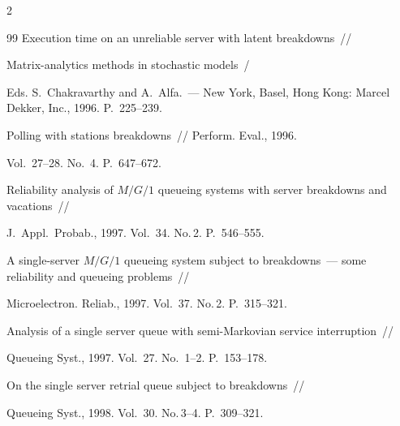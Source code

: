 \begin{multicols}{2}
{{\begin{thebibliography}{99}
Execution time on an unreliable server with latent breakdowns~//


Matrix-analytics methods in stochastic models~/


Eds. S.~Chakravarthy and A.~Alfa.~--- New York, Basel, Hong Kong: Marcel Dekker, Inc., 1996. P.~225--239.









Polling with stations breakdowns~// Perform. Eval., 1996.


Vol.~27--28. No.~4. P.~647--672.









Reliability analysis of $M/G/1$ queueing systems with server breakdowns and vacations~//


J.\ Appl.\ Probab., 1997. Vol.~34. No.\,2. P.~546--555.









A single-server $M/G/1$ queueing system subject to breakdowns~--- some reliability and queueing problems~//


Microelectron. Reliab., 1997. Vol.~37. No.\,2. P.~315--321.









Analysis of a single server queue with semi-Markovian service interruption~//


Queueing Syst., 1997. Vol.~27. No.~1--2. P.~153--178.









On the single server retrial queue subject to breakdowns~//


Queueing Syst., 1998. Vol.~30. No.\,3--4. P.~309--321.






\end{thebibliography}}}
\end{multicols}
